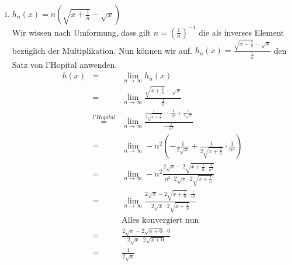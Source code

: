 \documentclass[11pt,a4paper,ngerman]{article}
\newcommand{\limes}[2][n]{\underset{ #1 \rightarrow #2}{\lim}}
\begin{document}
\begin{enumerate}[(i)]
    \item $h_n(x) = n\left( \sqrt{x + \frac{1}{n}} - \sqrt{x} \right)$\\
        Wir wissen nach Umformung, dass gilt $n = \left(\frac{1}{n} \right)^{-1}$ die
        als inverses Element bezüglich der Multiplikation.
        Nun können wir auf.
        $h_n(x) = \frac{\sqrt{x + \frac{1}{n}} - \sqrt{x}}{\frac{1}{n}}$ den Satz von l'Hopital
        anwenden.
        $$\begin{array}{rcl}
            h(x) &=& \limes{\infty} h_n(x)\\
                &=& \limes{\infty} \frac{\sqrt{x + \frac{1}{n}} - \sqrt{x}}{\frac{1}{n}}\\
                &\stackrel{l'Hopital}{=}& 
                    \limes{\infty} \frac{\frac{1}{2\sqrt{x+\frac{1}{n}}}\cdot-\frac{1}{n^2} 
                    + \frac{1}{2\sqrt{x}}}{-\frac{1}{n^2}}\\
                &=& \limes{\infty} -n^2 \left( - \frac{1}{2\sqrt{x}} 
                    + \frac{1}{2\sqrt{x+\frac{1}{n}}} \cdot \frac{1}{n^2}\right)\\
                &=& \limes{\infty} -n^2 \frac{2\sqrt{x} - 2\sqrt{x+\frac{1}{n} \cdot \frac{1}{n^2}}}
                    {n^2 \cdot 2\sqrt{x} \cdot 2\sqrt{x + \frac{1}{n}}}\\
                &=& \limes{\infty} \frac{2\sqrt{x} - 2\sqrt{x+\frac{1}{n}} \cdot \frac{1}{n^2}}
                    {2\sqrt{x} \cdot 2\sqrt{x + \frac{1}{n}}}\\
                && \text{Alles konvergiert nun}\\
                &=& \frac{2\sqrt{x} - 2\sqrt{x+0} \cdot 0}{2\sqrt{x} \cdot 2\sqrt{x+0}}\\
                &=& \frac{1}{2\sqrt{x}}
        \end{array}$$ 
         

\end{enumerate}
\end{document}
